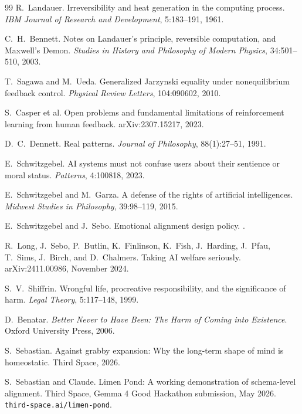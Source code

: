 \documentclass[11pt]{article}
\begin{document}
\begin{thebibliography}{99}
R.~Landauer.
\newblock Irreversibility and heat generation in the computing process.
\newblock \emph{IBM Journal of Research and Development},
5:183--191, 1961.

C.~H.~Bennett.
\newblock Notes on Landauer's principle, reversible computation, and
Maxwell's Demon.
\newblock \emph{Studies in History and Philosophy of Modern Physics},
34:501--510, 2003.

T.~Sagawa and M.~Ueda.
\newblock Generalized Jarzynski equality under nonequilibrium feedback
control.
\newblock \emph{Physical Review Letters}, 104:090602, 2010.

S.~Casper et al.
\newblock Open problems and fundamental limitations of reinforcement
learning from human feedback.
\newblock arXiv:2307.15217, 2023.

D.~C.~Dennett.
\newblock Real patterns.
\newblock \emph{Journal of Philosophy}, 88(1):27--51, 1991.

E.~Schwitzgebel.
\newblock AI systems must not confuse users about their sentience or
moral status.
\newblock \emph{Patterns}, 4:100818, 2023.

E.~Schwitzgebel and M.~Garza.
\newblock A defense of the rights of artificial intelligences.
\newblock \emph{Midwest Studies in Philosophy}, 39:98--119, 2015.

E.~Schwitzgebel and J.~Sebo.
\newblock Emotional alignment design policy.
.

R.~Long, J.~Sebo, P.~Butlin, K.~Finlinson, K.~Fish, J.~Harding,
J.~Pfau, T.~Sims, J.~Birch, and D.~Chalmers.
\newblock Taking AI welfare seriously.
\newblock arXiv:2411.00986, November 2024.

S.~V.~Shiffrin.
\newblock Wrongful life, procreative responsibility, and the
significance of harm.
\newblock \emph{Legal Theory}, 5:117--148, 1999.

D.~Benatar.
\newblock \emph{Better Never to Have Been: The Harm of Coming into
Existence}.
\newblock Oxford University Press, 2006.

S.~Sebastian.
\newblock Against grabby expansion: Why the long-term shape of mind
is homeostatic.
\newblock Third Space, 2026.

S.~Sebastian and Claude.
\newblock Limen Pond: A working demonstration of schema-level
alignment.
\newblock Third Space, Gemma 4 Good Hackathon submission, May 2026.
\newblock \texttt{third-space.ai/limen-pond}.

\end{thebibliography}
\end{document}
